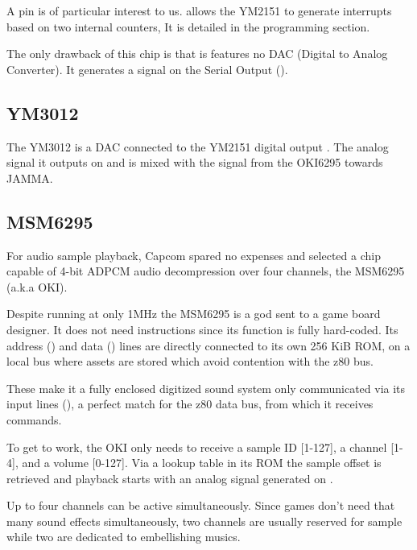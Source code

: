 A pin is of particular interest to us.  allows the YM2151 to generate interrupts based on two internal counters, It is detailed in the programming section.


The only drawback of this chip is that is features no DAC (Digital to Analog Converter). It generates a signal on the Serial Output (). 

\subsection{YM3012}

The YM3012 is a DAC connected to the YM2151 digital output . The analog signal it outputs on  and  is mixed with the signal from the OKI6295 towards JAMMA.



\subsection{MSM6295}

For audio sample playback, Capcom spared no expenses and selected a chip capable of 4-bit ADPCM audio decompression over four channels, the MSM6295 (a.k.a OKI). 

Despite running at only 1MHz the MSM6295 is a god sent to a game board designer. It does not need instructions since its function is fully hard-coded. Its address () and data () lines are directly connected to its own 256 KiB ROM, on a local bus where assets are stored which avoid contention with the z80 bus. 

These make it a fully enclosed digitized sound system only communicated via its input lines (), a perfect match for the z80 data bus, from which it receives commands.

To get to work, the OKI only needs to receive a sample ID [1-127], a channel [1-4], and a volume [0-127]. Via a lookup table in its ROM the sample offset is retrieved and playback starts with an analog signal generated on . 


Up to four channels can be active simultaneously. Since games don't need that many sound effects simultaneously, two channels are usually reserved for sample while two are dedicated to embellishing musics.

